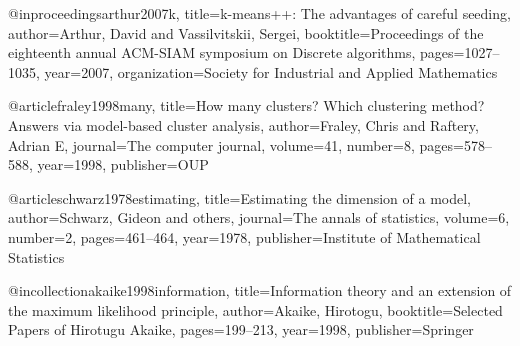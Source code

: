 @inproceedings{arthur2007k,
  title={k-means++: The advantages of careful seeding},
  author={Arthur, David and Vassilvitskii, Sergei},
  booktitle={Proceedings of the eighteenth annual ACM-SIAM symposium on Discrete algorithms},
  pages={1027--1035},
  year={2007},
  organization={Society for Industrial and Applied Mathematics}
}

@article{fraley1998many,
  title={How many clusters? Which clustering method? Answers via model-based cluster analysis},
  author={Fraley, Chris and Raftery, Adrian E},
  journal={The computer journal},
  volume={41},
  number={8},
  pages={578--588},
  year={1998},
  publisher={OUP}
}

@article{schwarz1978estimating,
  title={Estimating the dimension of a model},
  author={Schwarz, Gideon and others},
  journal={The annals of statistics},
  volume={6},
  number={2},
  pages={461--464},
  year={1978},
  publisher={Institute of Mathematical Statistics}
}

@incollection{akaike1998information,
  title={Information theory and an extension of the maximum likelihood principle},
  author={Akaike, Hirotogu},
  booktitle={Selected Papers of Hirotugu Akaike},
  pages={199--213},
  year={1998},
  publisher={Springer}
}